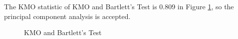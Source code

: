 \documentclass[review,3p,times,12pt,number]{elsarticle}
\begin{document}
The KMO statistic of KMO and Bartlett's Test is 0.809 in Figure \ref{weibo:fig:kmo_test}, so the principal component analysis is accepted.
\begin{figure}[htbp]
\centering
\caption{KMO and Bartlett's Test}
\label{weibo:fig:kmo_test}
\end{figure}
\end{document}
